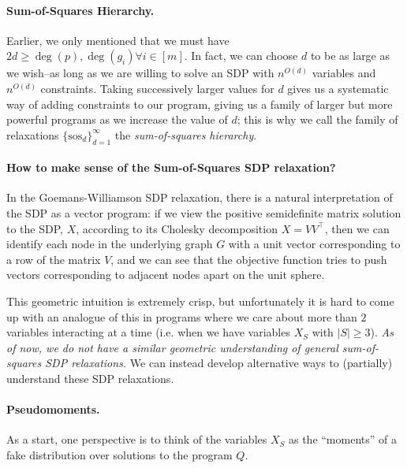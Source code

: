 \documentclass[a4paper,11pt]{article}
\newcommand{\sos}{\mathrm{sos}}
\theoremstyle{definition}
\begin{document}
\paragraph{Sum-of-Squares Hierarchy.}
Earlier, we only mentioned that we must have $2d \ge \deg(p), \deg(g_i) \forall i \in [m]$.
In fact, we can choose $d$ to be as large as we wish--as long as we are willing to solve an SDP with $n^{O(d)}$ variables and $n^{O(d)}$ constraints.
Taking successively larger values for $d$ gives us a systematic way of adding constraints to our program, giving us a family of larger but more powerful programs as we increase the value of $d$; this is why we call the family of relaxations $\{\sos_d\}_{d = 1}^{\infty}$ the {\em sum-of-squares hierarchy}.


\paragraph{How to make sense of the Sum-of-Squares SDP relaxation?}
In the Goemans-Williamson SDP relaxation, there is a natural interpretation of the SDP as a vector program: if we view the positive semidefinite matrix solution to the SDP, $X$, according to its Cholesky decomposition $X = VV^{\top}$, then we can identify each node in the underlying graph $G$ with a unit vector corresponding to a row of the matrix $V$, and we can see that the objective function tries to push vectors corresponding to adjacent nodes apart on the unit sphere.

This geometric intuition is extremely crisp, but unfortunately it is hard to come up with an analogue of this in programs where we care about more than $2$ variables interacting at a time (i.e. when we have variables $X_S$ with $|S| \ge 3$). 
{\em As of now, we do not have a similar geometric understanding of general sum-of-squares SDP relaxations.}
We can instead develop alternative ways to (partially) understand these SDP relaxations.


\paragraph{Pseudomoments.}
As a start, one perspective is to think of the variables $X_S$ as the ``moments'' of a fake distribution over solutions to the program $Q$.
\end{document}
